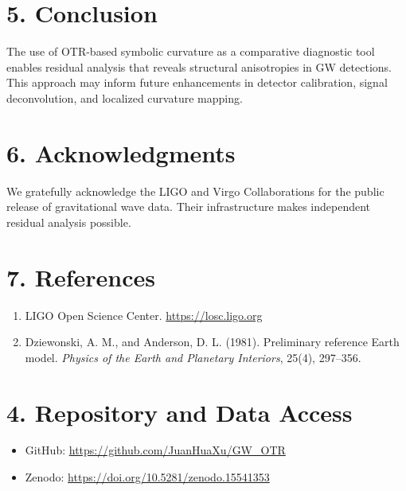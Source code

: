\documentclass[11pt]{article}
\begin{document}
	\section*{5. Conclusion}
	The use of OTR-based symbolic curvature as a comparative diagnostic tool enables residual analysis that reveals structural anisotropies in GW detections. This approach may inform future enhancements in detector calibration, signal deconvolution, and localized curvature mapping.
	
	\section*{6. Acknowledgments}
	We gratefully acknowledge the LIGO and Virgo Collaborations for the public release of gravitational wave data. Their infrastructure makes independent residual analysis possible.
	
	\section*{7. References}
	\begin{enumerate}
		\item LIGO Open Science Center. \url{https://losc.ligo.org}
		\item Dziewonski, A. M., and Anderson, D. L. (1981). Preliminary reference Earth model. \emph{Physics of the Earth and Planetary Interiors}, 25(4), 297–356.
	\end{enumerate}
	
	\section*{4. Repository and Data Access}
	\begin{itemize}
		\item GitHub: \url{https://github.com/JuanHuaXu/GW_OTR}
		\item Zenodo: \url{https://doi.org/10.5281/zenodo.15541353}
	\end{itemize}
	
\end{document}
